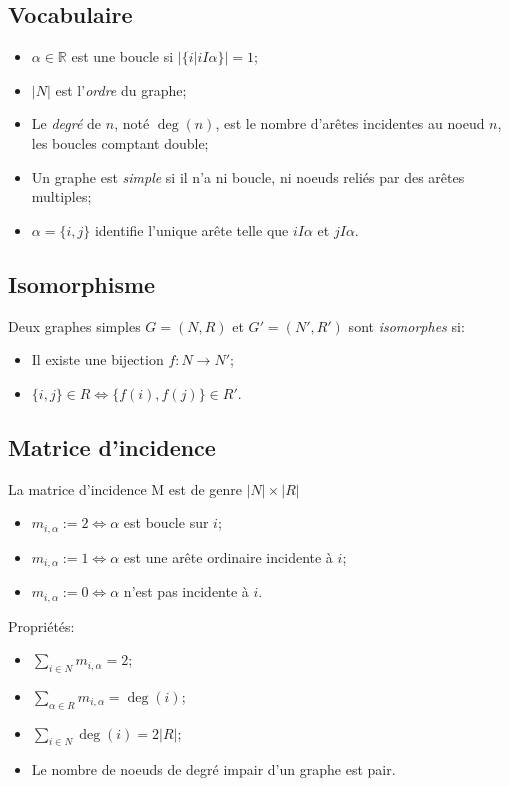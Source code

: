 \subsection{Vocabulaire}
\begin{itemize}
  \item $\alpha \in \mathbb{R}$ est une boucle si $|\{i|iI\alpha\}| = 1$;
  \item $|N|$ est l'\emph{ordre} du graphe;
  \item Le \emph{degré} de $n$, noté $\deg(n)$,
    est le nombre d'arêtes incidentes au noeud $n$, les boucles comptant double;
  \item Un graphe est \emph{simple} si il n'a ni boucle,
    ni noeuds reliés par des arêtes multiples;
  \item $\alpha = \{i, j\}$ identifie l'unique arête
    telle que $iI\alpha$ et $jI\alpha$.
\end{itemize}

\subsection{Isomorphisme}
Deux graphes simples $G = (N,R)$ et $G' = (N',R')$ sont \emph{isomorphes} si:
\begin{itemize}
  \item Il existe une bijection $f : N \rightarrow N'$;
  \item $\{i,j\} \in R \Leftrightarrow \{f(i), f(j)\} \in R'$.
\end{itemize}

\subsection{Matrice d'incidence}
La matrice d'incidence M est de genre $|N|\times |R|$
\begin{itemize}
  \item $m_{i,\alpha} := 2 \Leftrightarrow \alpha$ est boucle sur $i$;
  \item $m_{i,\alpha} := 1 \Leftrightarrow \alpha$
    est une arête ordinaire incidente à $i$;
  \item $m_{i,\alpha} := 0 \Leftrightarrow \alpha$ n'est pas incidente à $i$.
\end{itemize}
Propriétés:
\begin{itemize}
  \item $\sum_{i \in N}m_{i,\alpha} = 2$;
  \item $\sum_{\alpha \in R}m_{i,\alpha} = \deg(i)$;
  \item $\sum_{i \in N}\deg(i) = 2|R|$;
  \item Le nombre de noeuds de degré impair d'un graphe est pair.
\end{itemize}

